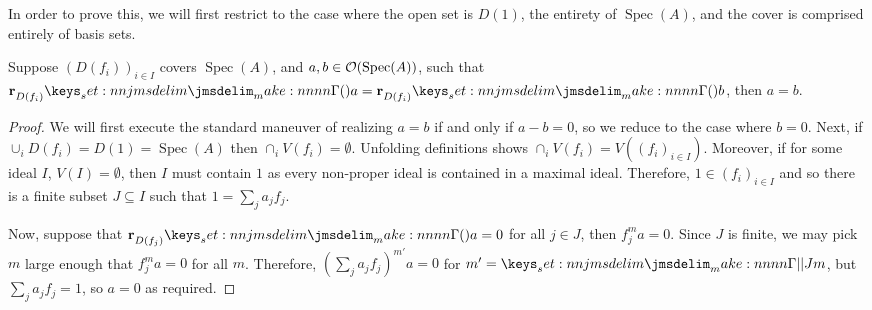\documentclass{amsart}
\DeclareMathOperator{\Spec}{Spec}
\begin{document}
In order to prove this, we will first restrict to the case where the open set is $D(1)$, the
entirety of $\Spec(A)$, and the cover is comprised entirely of basis sets.
\begin{theorem}
  \label{thm:basis-restrict}
  Suppose $(D(f_i))_{i \in I}$ covers $\Spec(A)$, and $a, b \in \StructSh(\Spec(A))$, such that
  $\Res{a}{D(f_i)} = \Res{b}{D(f_i)}$, then $a = b$.
\end{theorem}
\begin{proof}
  We will first execute the standard maneuver of realizing $a = b$ if and only if $a - b = 0$, so we
  reduce to the case where $b = 0$. Next, if $\cup_i D(f_i) = D(1) = \Spec(A)$ then
  $\cap_i V(f_i) = \emptyset$. Unfolding definitions shows $\cap_i V(f_i) = V((f_i)_{i \in
    I})$. Moreover, if for some ideal $I$, $V(I) = \emptyset$, then $I$ must contain $1$ as every
  non-proper ideal is contained in a maximal ideal. Therefore, $1 \in (f_i)_{i \in I}$ and so there
  is a finite subset $J \subseteq I$ such that $1 = \sum_j a_jf_j$.

  Now, suppose that $\Res{a}{D(f_j)} = 0$ for all $j \in J$, then $f_j^m a = 0$. Since $J$ is
  finite, we may pick $m$ large enough that $f_j^m a = 0$ for all $m$. Therefore,
  $(\sum_j a_jf_j)^{m'} a = 0$ for $m' = \verts{J} m$, but $\sum_j a_jf_j = 1$, so $a = 0$ as
  required.
\end{proof}
\end{document}
